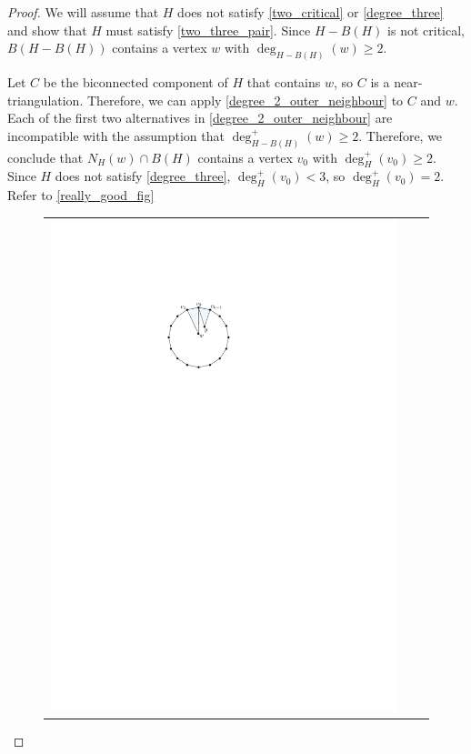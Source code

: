 \documentclass[12pt]{article}
\theoremstyle{definition}
\begin{document}
\begin{proof}
  We will assume that $H$ does not satisfy \cref{two_critical} or \cref{degree_three} and show that $H$ must satisfy \cref{two_three_pair}.  Since $H-B(H)$ is not critical, $B(H-B(H))$ contains a vertex $w$ with $\deg_{H-B(H)}(w)\ge 2$.

  Let $C$ be the biconnected component of $H$ that contains $w$, so $C$ is a near-triangulation.  Therefore, we can apply \cref{degree_2_outer_neighbour} to $C$ and $w$. Each of the first two alternatives in \cref{degree_2_outer_neighbour} are incompatible with the assumption that $\deg^+_{H-B(H)}(w)\ge 2$.  Therefore, we conclude that $N_H(w)\cap B(H)$ contains a vertex $v_0$ with $\deg^+_H(v_0)\ge 2$.  Since $H$ does not satisfy \cref{degree_three}, $\deg^+_H(v_0)< 3$, so $\deg^+_H(v_0)=2$.  Refer to \cref{really_good_fig}
  \begin{figure}
    \begin{center}
      \begin{tabular}{ccc}
        \includegraphics[page=1]{figs/really_good} &

\end{tabular}
\end{center}
\end{figure}
\end{proof}
\end{document}
